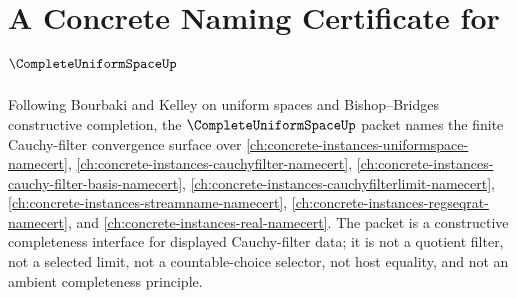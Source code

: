 \chapter{A Concrete Naming Certificate for $\CompleteUniformSpaceUp$}
\label{ch:concrete-instances-complete-uniform-space-namecert}

Following Bourbaki and Kelley on uniform spaces and Bishop--Bridges constructive completion, the $\CompleteUniformSpaceUp$ packet names the finite Cauchy-filter convergence surface over \autoref{ch:concrete-instances-uniformspace-namecert}, \autoref{ch:concrete-instances-cauchyfilter-namecert}, \autoref{ch:concrete-instances-cauchy-filter-basis-namecert}, \autoref{ch:concrete-instances-cauchyfilterlimit-namecert}, \autoref{ch:concrete-instances-streamname-namecert}, \autoref{ch:concrete-instances-regseqrat-namecert}, and \autoref{ch:concrete-instances-real-namecert}. The packet is a constructive completeness interface for displayed Cauchy-filter data; it is not a quotient filter, not a selected limit, not a countable-choice selector, not host equality, and not an ambient completeness principle.

